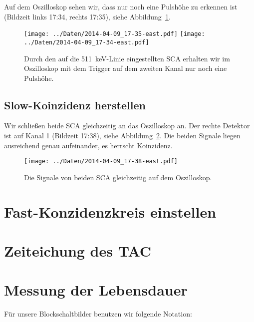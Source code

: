 Auf dem Oszilloskop sehen wir, dass nur noch eine Pulshöhe zu erkennen ist (Bildzeit
links 17:34, rechts 17:35), siehe Abbildung~\ref{fig:eine_pulshoehe}.

\begin{figure}[htbp]
    \centering
    \texttt{[image: ../Daten/2014-04-09\_17-35-east.pdf]}
    \hfill
    \texttt{[image: ../Daten/2014-04-09\_17-34-east.pdf]}
    \caption{%
        Durch den auf die \SI{511}{\kilo\electronvolt}-Linie eingestellten SCA
        erhalten wir im Oszilloskop mit dem Trigger auf dem zweiten Kanal nur
        noch eine Pulshöhe.
    }
    \label{fig:eine_pulshoehe}
\end{figure}

\subsection{Slow-Koinzidenz herstellen}

Wir schließen beide SCA gleichzeitig an das Oszilloskop an. Der rechte Detektor
ist auf Kanal 1 (Bildzeit 17:38), siehe Abbildung~\ref{fig:beide_sca}. Die
beiden Signale liegen ausreichend genau aufeinander, es herrscht Koinzidenz.

\begin{figure}[htbp]
    \centering
    \texttt{[image: ../Daten/2014-04-09\_17-38-east.pdf]}
    \hfill
    \caption{%
        Die Signale von beiden SCA gleichzeitig auf dem Oszilloskop.
    }
    \label{fig:beide_sca}
\end{figure}

\section{Fast-Konzidenzkreis einstellen}

\section{Zeiteichung des TAC}

\section{Messung der Lebensdauer}

Für unsere Blockschaltbilder benutzen wir folgende Notation:

